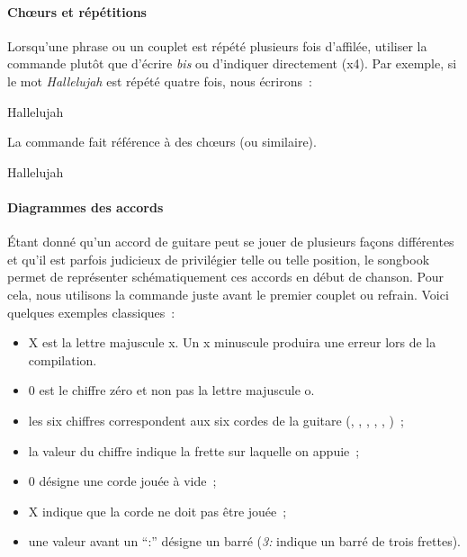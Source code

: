 \paragraph{Ch\oe{}urs et répétitions}
Lorsqu'une phrase ou un couplet est répété plusieurs fois d'affilée,
utiliser la commande  plutôt que d'écrire \emph{bis} ou
d'indiquer directement (x4). Par exemple, si le mot \emph{Hallelujah}
est répété quatre fois, nous écrirons~:

\begin{songbook}
Hallelujah 
\end{songbook}

La commande  fait référence à des chœurs (ou
similaire).

\begin{songbook}
Hallelujah 
\end{songbook}

\paragraph{Diagrammes des accords}
Étant donné qu'un accord de guitare peut se jouer de plusieurs façons
différentes et qu'il est parfois judicieux de privilégier telle ou
telle position, le songbook permet de représenter schématiquement ces
accords en début de chanson. Pour cela, nous utilisons la commande
 juste avant le premier couplet ou refrain. Voici
quelques exemples classiques~:

\begin{songbook}
\end{songbook}

\begin{nota}
  \begin{itemize}
  \item X est la lettre majuscule x. Un x minuscule produira une erreur lors de la compilation.
  \item 0 est le chiffre zéro et non pas la lettre majuscule o.
  \end{itemize}
\end{nota}

\begin{itemize}
\item les six chiffres correspondent aux six cordes de la guitare
  (, , , ,
  , )~;
\item la valeur du chiffre indique la frette sur laquelle on
  appuie~;
\item 0 désigne une corde jouée à vide~;
\item X indique que la corde ne doit pas être jouée~;
\item une valeur avant un ``:'' désigne un barré (\emph{3:} indique un
  barré de trois frettes).
\end{itemize}

